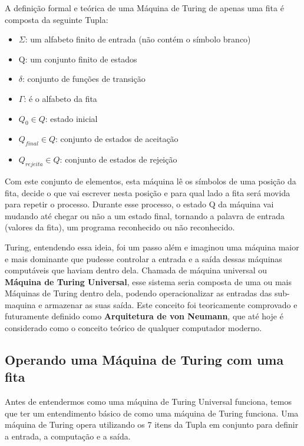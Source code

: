 \documentclass[
	article,			%
	11pt,				%
	oneside,			%
	a4paper,			%
	english,			%
	brazil,				%
	sumario=tradicional
	]{abntex2}
\begin{document}
    A definição formal e teórica de uma Máquina de Turing de apenas uma fita é composta da seguinte Tupla:
    
    \begin{itemize}
        \item $\Sigma$: um alfabeto finito de entrada (não contém o símbolo branco)
        \item Q: um conjunto finito de estados
        \item $\delta$: conjunto de funções de transição
        \item $\Gamma$: é o alfabeto da fita
        \item $Q_0 \in Q$: estado inicial
        \item $Q_{final} \in Q $: conjunto de estados de aceitação
        \item $Q_{rejeita} \in Q $: conjunto de estados de rejeição
\end{itemize}
    
    Com este conjunto de elementos, esta máquina lê os símbolos de uma posição da fita, decide o que vai escrever nesta posição e para qual lado a fita será movida para repetir o processo. Durante esse processo, o estado Q da máquina vai mudando até chegar ou não a um estado final, tornando a palavra de entrada (valores da fita), um programa reconhecido ou não reconhecido. 
    
    Turing, entendendo essa ideia, foi um passo além e imaginou uma máquina maior e mais dominante que pudesse controlar a entrada e a saída dessas máquinas computáveis que haviam dentro dela.  Chamada de máquina universal ou \textbf{Máquina de Turing Universal}, esse sistema seria composta de uma ou mais Máquinas de Turing dentro dela, podendo operacionalizar as entradas das sub-maquina e armazenar as suas saída. Este conceito foi teoricamente comprovado e futuramente definido como \textbf{Arquitetura de von Neumann}, que até hoje é considerado como o conceito teórico de qualquer computador moderno. 
    
    \subsection{Operando uma Máquina de Turing com uma fita}
    Antes de entendermos como uma máquina de Turing Universal funciona, temos que ter um entendimento básico de como uma máquina de Turing funciona. Uma máquina de Turing opera utilizando os 7 itens da Tupla em conjunto para definir a entrada, a computação e a saída.
    
\end{document}
